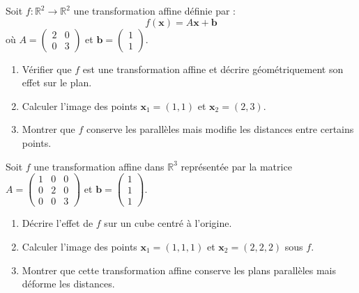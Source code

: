 \begin{exercice}
Soit \( f : \mathbb{R}^2 \to \mathbb{R}^2 \) une transformation affine définie par :
\[
f(\mathbf{x}) = A \mathbf{x} + \mathbf{b}
\]
où \( A = \begin{pmatrix} 2 & 0 \\ 0 & 3 \end{pmatrix} \) et \( \mathbf{b} = \begin{pmatrix} 1 \\ 1 \end{pmatrix} \).
\begin{enumerate}
    \item Vérifier que \( f \) est une transformation affine et décrire géométriquement son effet sur le plan.
    \item Calculer l'image des points \( \mathbf{x}_1 = (1, 1) \) et \( \mathbf{x}_2 = (2, 3) \).
    \item Montrer que \( f \) conserve les parallèles mais modifie les distances entre certains points.
\end{enumerate}
\end{exercice}

\begin{exercice}
Soit \( f \) une transformation affine dans \( \mathbb{R}^3 \) représentée par la matrice \( A = \begin{pmatrix} 1 & 0 & 0 \\ 0 & 2 & 0 \\ 0 & 0 & 3 \end{pmatrix} \) et \( \mathbf{b} = \begin{pmatrix} 1 \\ 1 \\ 1 \end{pmatrix} \). 
\begin{enumerate}
    \item Décrire l'effet de \( f \) sur un cube centré à l'origine. 
    \item Calculer l'image des points \( \mathbf{x}_1 = (1, 1, 1) \) et \( \mathbf{x}_2 = (2, 2, 2) \) sous \( f \).
    \item Montrer que cette transformation affine conserve les plans parallèles mais déforme les distances.
\end{enumerate}
\end{exercice}

